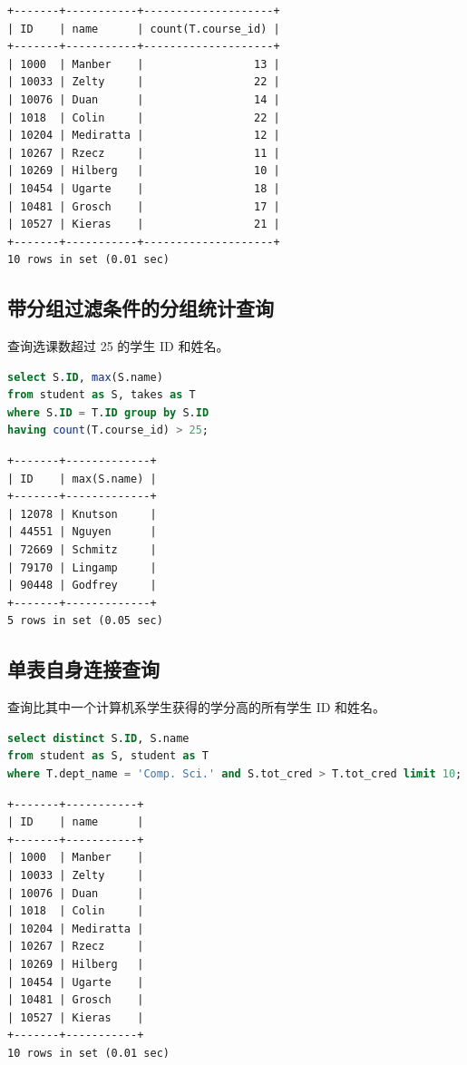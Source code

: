 \documentclass{article}
\begin{document}
\begin{lstlisting}
+-------+-----------+--------------------+
| ID    | name      | count(T.course_id) |
+-------+-----------+--------------------+
| 1000  | Manber    |                 13 |
| 10033 | Zelty     |                 22 |
| 10076 | Duan      |                 14 |
| 1018  | Colin     |                 22 |
| 10204 | Mediratta |                 12 |
| 10267 | Rzecz     |                 11 |
| 10269 | Hilberg   |                 10 |
| 10454 | Ugarte    |                 18 |
| 10481 | Grosch    |                 17 |
| 10527 | Kieras    |                 21 |
+-------+-----------+--------------------+
10 rows in set (0.01 sec)
\end{lstlisting}

\subsection{带分组过滤条件的分组统计查询}

查询选课数超过 25 的学生 ID 和姓名。

\begin{lstlisting}[language=sql]
select S.ID, max(S.name)
from student as S, takes as T
where S.ID = T.ID group by S.ID
having count(T.course_id) > 25;
\end{lstlisting}

\begin{lstlisting}
+-------+-------------+
| ID    | max(S.name) |
+-------+-------------+
| 12078 | Knutson     |
| 44551 | Nguyen      |
| 72669 | Schmitz     |
| 79170 | Lingamp     |
| 90448 | Godfrey     |
+-------+-------------+
5 rows in set (0.05 sec)
\end{lstlisting}

\subsection{单表自身连接查询}

查询比其中一个计算机系学生获得的学分高的所有学生 ID 和姓名。

\begin{lstlisting}[language=sql]
select distinct S.ID, S.name
from student as S, student as T
where T.dept_name = 'Comp. Sci.' and S.tot_cred > T.tot_cred limit 10;
\end{lstlisting}

\begin{lstlisting}
+-------+-----------+
| ID    | name      |
+-------+-----------+
| 1000  | Manber    |
| 10033 | Zelty     |
| 10076 | Duan      |
| 1018  | Colin     |
| 10204 | Mediratta |
| 10267 | Rzecz     |
| 10269 | Hilberg   |
| 10454 | Ugarte    |
| 10481 | Grosch    |
| 10527 | Kieras    |
+-------+-----------+
10 rows in set (0.01 sec)
\end{lstlisting}
\end{document}
